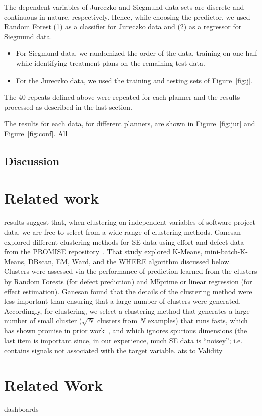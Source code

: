 \documentclass{sig-alternate}
\newcommand{\bi}{\begin{itemize}}
\newcommand{\ei}{\end{itemize}}
\newcommand{\fig}[1]{Figure~\ref{fig:#1}}
\begin{document}
  The dependent variables of Jureczko and Siegmund data sets are discrete and continuous in nature, respectively. Hence, while choosing the predictor, we used Random Forest (1) as a classifier for Jureczko data and (2) as a regressor for Siegmund data.
\bi
\item For Siegmund data, we randomized the order of the data, training on one half while identifying treatment plans on the remaining test data.
\item For the Jureczko data, we used the training and testing sets of \fig{j}. 
\ei
The 40 repeats defined above were repeated for each planner and the results processed as described in the last section.



The results for each data, for different planners, are shown in \fig{jur} and \fig{conf}. All
\subsection{Discussion} 

	
\section{Related work}
results suggest that, when clustering on independent variables of software project data,
	we are free to select from a wide range of 
	clustering methods.  Ganesan~\cite{div14} explored 
	different clustering methods for SE data using   effort and defect data from
	the PROMISE repository~\cite{promiserepo}.
	That study explored
	K-Means, mini-batch-K-Means, DBscan, EM, Ward, and the WHERE algorithm discussed
	below.
	Clusters were assessed via the performance of prediction 
	learned from the clusters by Random Forests (for defect prediction)
	and M5prime or linear regression (for effect estimation).  Ganesan found
	that the details of the clustering method were less important than ensuring that  a large number of clusters were generated.
	Accordingly, for clustering, we select a clustering method that generates a large
	number of small cluster
	($\sqrt{N}$ clusters
	from $N$ examples) that runs fasts, which has shown promise in prior work~\cite{Menzies2013}, and which ignores spurious dimensions (the last item is important since, in our experience, much SE data is ``noisey''; i.e. contains signals not associated with the target variable.
	ats to Validity






\section{Related Work}
dashboards
\end{document}
